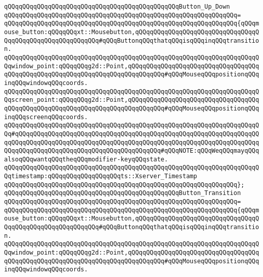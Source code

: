 \newline
\verb|qQQqqQQqqQQqqQQqqQQqqQQqqQQqqQQqqQQqqQQqqQQqqQQqButton_Up_Down|\newline
\verb|qQQqqQQqqQQqqQQqqQQqqQQqqQQqqQQqqQQqqQQqqQQqqQQqqQQqqQQqqQQqqQQq=|\newline
\verb|qQQqqQQqqQQqqQQqqQQqqQQqqQQqqQQqqQQqqQQqqQQqqQQqqQQqqQQqqQQqqQQq{qQQqmouse_button:qQQqqQQqxt::Mousebutton,qQQqqQQqqQQqqQQqqQQqqQQqqQQqqQQqqQQqqQQqqQQqqQQqqQQqqQQqqQQq#qQQqButtonqQQqthatqQQqisqQQqinqQQqtransition.|\newline
\verb|qQQqqQQqqQQqqQQqqQQqqQQqqQQqqQQqqQQqqQQqqQQqqQQqqQQqqQQqqQQqqQQqqQQqqQQqwindow_point:qQQqqQQqg2d::Point,qQQqqQQqqQQqqQQqqQQqqQQqqQQqqQQqqQQqqQQqqQQqqQQqqQQqqQQqqQQqqQQqqQQqqQQqqQQqqQQq#qQQqMouseqQQqpositionqQQqinqQQqwindowqQQqcoords.|\newline
\verb|qQQqqQQqqQQqqQQqqQQqqQQqqQQqqQQqqQQqqQQqqQQqqQQqqQQqqQQqqQQqqQQqqQQqqQQqscreen_point:qQQqqQQqg2d::Point,qQQqqQQqqQQqqQQqqQQqqQQqqQQqqQQqqQQqqQQqqQQqqQQqqQQqqQQqqQQqqQQqqQQqqQQqqQQqqQQq#qQQqMouseqQQqpositionqQQqinqQQqscreenqQQqcoords.|\newline
\verb|qQQqqQQqqQQqqQQqqQQqqQQqqQQqqQQqqQQqqQQqqQQqqQQqqQQqqQQqqQQqqQQqqQQqqQQq#qQQqqQQqqQQqqQQqqQQqqQQqqQQqqQQqqQQqqQQqqQQqqQQqqQQqqQQqqQQqqQQqqQQqqQQqqQQqqQQqqQQqqQQqqQQqqQQqqQQqqQQqqQQqqQQqqQQqqQQqqQQqqQQqqQQqqQQqqQQqqQQqqQQqqQQqqQQqqQQqqQQqqQQqqQQqqQQqqQQq#qQQqNOTE:qQQqWeqQQqmayqQQqalsoqQQqwantqQQqtheqQQqmodifier-keyqQQqstate.|\newline
\verb|qQQqqQQqqQQqqQQqqQQqqQQqqQQqqQQqqQQqqQQqqQQqqQQqqQQqqQQqqQQqqQQqqQQqqQQqtimestamp:qQQqqQQqqQQqqQQqqQQqts::Xserver_Timestamp|\newline
\verb|qQQqqQQqqQQqqQQqqQQqqQQqqQQqqQQqqQQqqQQqqQQqqQQqqQQqqQQqqQQqqQQq};|\newline
\newline
\verb|qQQqqQQqqQQqqQQqqQQqqQQqqQQqqQQqqQQqqQQqqQQqqQQqButton_Transition|\newline
\verb|qQQqqQQqqQQqqQQqqQQqqQQqqQQqqQQqqQQqqQQqqQQqqQQqqQQqqQQqqQQqqQQq=|\newline
\verb|qQQqqQQqqQQqqQQqqQQqqQQqqQQqqQQqqQQqqQQqqQQqqQQqqQQqqQQqqQQqqQQq{qQQqmouse_button:qQQqqQQqxt::Mousebutton,qQQqqQQqqQQqqQQqqQQqqQQqqQQqqQQqqQQqqQQqqQQqqQQqqQQqqQQqqQQq#qQQqButtonqQQqthatqQQqisqQQqinqQQqtransition.|\newline
\verb|qQQqqQQqqQQqqQQqqQQqqQQqqQQqqQQqqQQqqQQqqQQqqQQqqQQqqQQqqQQqqQQqqQQqqQQqwindow_point:qQQqqQQqg2d::Point,qQQqqQQqqQQqqQQqqQQqqQQqqQQqqQQqqQQqqQQqqQQqqQQqqQQqqQQqqQQqqQQqqQQqqQQqqQQqqQQq#qQQqMouseqQQqpositionqQQqinqQQqwindowqQQqcoords.|\newline

